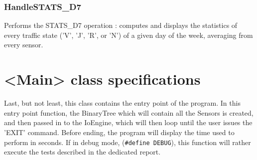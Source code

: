 \documentclass[10pt]{article}
\begin{document}
\subsubsection*{HandleSTATS\_D7}
Performs the STATS\_D7 operation : computes and displays the statistics of every traffic state ('V', 'J', 'R', or 'N') of a given day of the week, averaging from every sensor\footnotemark[2].

\section{<Main> class specifications}
Last, but not least, this class contains the entry point of the program. In this entry point function, the BinaryTree which will contain all the Sensors is created, and then passed in to the IoEngine, which will then loop until the user issues the 'EXIT' command. Before ending, the program will display the time used to perform in seconds.
If in debug mode, (\texttt{\#define DEBUG}), this function will rather execute the tests described in the dedicated report.
\end{document}
